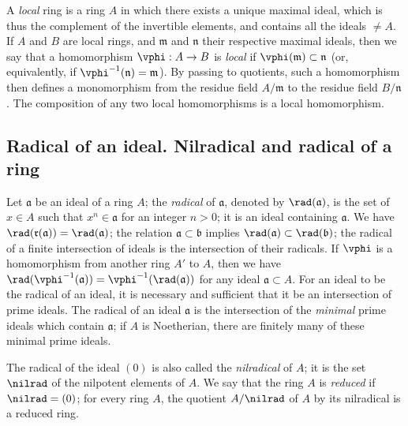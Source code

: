 \begin{env}[1.0.7]
\label{0.1.0.7}
A \emph{local} ring is a ring $A$ in which there exists a unique maximal ideal, which is thus the complement of the invertible elements, and contains all the ideals $\neq A$.
If $A$ and $B$ are local rings, and $\mathfrak{m}$ and $\mathfrak{n}$ their respective maximal ideals, then we say that a homomorphism $\vphi:A\to B$ is \emph{local} if $\vphi(\mathfrak{m})\subset\mathfrak{n}$ (or, equivalently, if $\vphi^{-1}(\mathfrak{n})=\mathfrak{m}$).
By passing to quotients, such a homomorphism then defines a monomorphism from the residue field $A/\mathfrak{m}$ to the residue field $B/\mathfrak{n}$.
The composition of any two local homomorphisms is a local homomorphism.
\end{env}

\subsection{Radical of an ideal. Nilradical and radical of a ring}
\label{subsection:0.1.1}

\begin{env}[1.1.1]
\label{0.1.1.1}
Let $\mathfrak{a}$ be an ideal of a ring $A$;
the \emph{radical} of $\mathfrak{a}$, denoted by $\rad(\mathfrak{a})$, is the set of $x\in A$ such that $x^n\in\mathfrak{a}$ for an integer $n>0$;
it is an ideal containing $\mathfrak{a}$.
We have $\rad(\mathfrak{r}(\mathfrak{a}))=\rad(\mathfrak{a})$;
the relation $\mathfrak{a}\subset\mathfrak{b}$ implies $\rad(\mathfrak{a})\subset\rad(\mathfrak{b})$;
the radical of a finite intersection of ideals is the intersection of their radicals.
If $\vphi$ is a homomorphism from another ring $A'$ to $A$, then we have $\rad(\vphi^{-1}(\mathfrak{a}))=\vphi^{-1}(\rad(\mathfrak{a}))$ for any ideal $\mathfrak{a}\subset A$.
For an ideal to be the radical of an ideal, it is necessary and sufficient that it be an intersection of prime ideals.
The radical of an ideal $\mathfrak{a}$ is the intersection of the \emph{minimal} prime ideals which contain $\mathfrak{a}$;
if $A$ is Noetherian, there are finitely many of these minimal prime ideals.

The radical of the ideal $(0)$ is also called the \emph{nilradical} of $A$;
it is the set $\nilrad$ of the nilpotent elements of $A$.
We say that the ring $A$ is \emph{reduced} if $\nilrad=(0)$;
for every ring $A$, the quotient $A/\nilrad$ of $A$ by its nilradical is a reduced ring.
\end{env}

